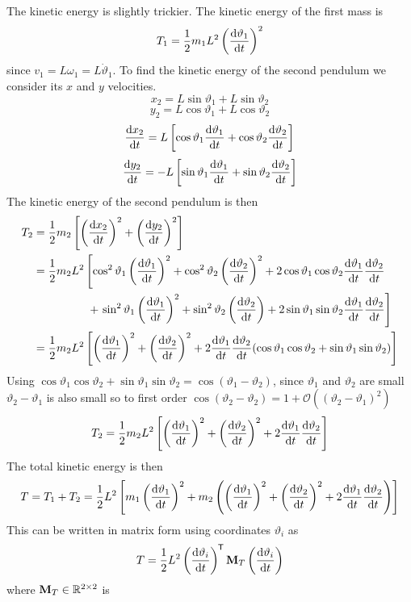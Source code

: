\documentclass{article}
\newcommand{\mat}[1]{\mathbf{#1}}
\begin{document}
    The kinetic energy is slightly trickier.
    The kinetic energy of the first mass is
    \[T_1 = \frac{1}{2}m_1L^2\left(\dv{\vartheta_1}{t}\right)^2\]
    since \(v_1 = L\omega_1 = L\dot\vartheta_1\).
    To find the kinetic energy of the second pendulum we consider its \(x\) and \(y\) velocities.
    \[x_2 = L\sin\vartheta_1 + L\sin\vartheta_2\]
    \[y_2 = L\cos\vartheta_1 + L\cos\vartheta_2\]
    \[\dv{x_2}{t} = L\left[\cos\vartheta_1\dv{\vartheta_1}{t} + \cos\vartheta_2\dv{\vartheta_2}{t}\right]\]
    \[\dv{y_2}{t} = -L\left[\sin\vartheta_1\dv{\vartheta_1}{t} + \sin\vartheta_2\dv{\vartheta_2}{t}\right]\]
    The kinetic energy of the second pendulum is then
    \begin{align*}
        T_2 &= \frac{1}{2}m_2\left[\left(\dv{x_2}{t}\right)^2 + \left(\dv{y_2}{t}\right)^2\right]\\
        &= \frac{1}{2}m_2L^2\left[\cos^2\vartheta_1\left(\dv{\vartheta_1}{t}\right)^2 + \cos^2\vartheta_2\left(\dv{\vartheta_2}{t}\right)^2 + 2\cos\vartheta_1\cos\vartheta_2\dv{\vartheta_1}{t}\dv{\vartheta_2}{t}\right.\\
        &\hphantom{=\frac{1}{2}m_2L^2[]} + \left.\sin^2\vartheta_1\left(\dv{\vartheta_1}{t}\right)^2 + \sin^2\vartheta_2\left(\dv{\vartheta_2}{t}\right) + 2\sin\vartheta_1\sin\vartheta_2\dv{\vartheta_1}{t}\dv{\vartheta_2}{t}\right]\\
        &= \frac{1}{2}m_2L^2\left[\left(\dv{\vartheta_1}{t}\right)^2 + \left(\dv{\vartheta_2}{t}\right)^2 + 2\dv{\vartheta_1}{t}\dv{\vartheta_2}{t}\,\! (\cos\vartheta_1\cos\vartheta_2 + \sin\vartheta_1\sin\vartheta_2)\right]
    \end{align*}
    Using \(\cos\vartheta_1\cos\vartheta_2 + \sin\vartheta_1\sin\vartheta_2 = \cos(\vartheta_1 - \vartheta_2)\), since \(\vartheta_1\) and \(\vartheta_2\) are small \(\vartheta_2 - \vartheta_1\) is also small so to first order \(\cos(\vartheta_2 - \vartheta_2) = 1 + \mathcal O ((\vartheta_2 - \vartheta_1)^2)\)
    \[T_2 = \frac{1}{2}m_2L^2\left[\left(\dv{\vartheta_1}{t}\right)^2 + \left(\dv{\vartheta_2}{t}\right)^2 + 2\dv{\vartheta_1}{t}\dv{\vartheta_2}{t}\right]\]
    The total kinetic energy is then
    \[T = T_1 + T_2 = \frac{1}{2}L^2\left[m_1\left(\dv{\vartheta_1}{t}\right)^2 + m_2\left(\left(\dv{\vartheta_1}{t}\right)^2 + \left(\dv{\vartheta_2}{t}\right)^2 + 2\dv{\vartheta_1}{t}\dv{\vartheta_2}{t}\right)\right]\]
    This can be written in matrix form using coordinates \(\vartheta_i\) as
    \[T = \frac{1}{2}L^2\left(\dv{\vartheta_i}{t}\right)\trans\mat M_T\left(\dv{\vartheta_i}{t}\right)\]
    where \(\mat M_T\in\bb R^{2\times2}\) is
\end{document}

